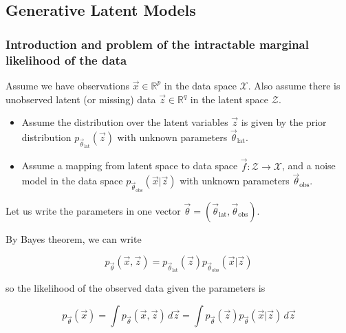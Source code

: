 
\subsection{Generative Latent Models}
\subsubsection{Introduction and problem of the intractable marginal likelihood of the data}
Assume we have observations $\vec{x} \in \mathbb{R}^p$ in the data space $\mathcal{X}$. 
Also assume there is unobserved latent (or missing) 
data $\vec{z} \in \mathbb{R}^q$ in the latent space $\mathcal{Z}$.

\begin{itemize}
    \item Assume the distribution over the latent variables $\vec{z}$ is given
    by the prior distribution $p_{\vec{\theta}_{\text{lat}}}(\vec{z})$ with unknown parameters
    $\vec{\theta}_{\text{lat}}$.
    \item Assume a mapping from latent space to data space $\vec{f}: \mathcal{Z} \rightarrow \mathcal{X}$,
    and a noise model in the data space $p_{\vec{\theta}_{\text{obs}}}(\vec{x} | \vec{z})$ with unknown parameters
    $\vec{\theta}_{\text{obs}}$.
\end{itemize}

Let us write the parameters in one vector $\vec{\theta} = (\vec{\theta}_{\text{lat}}, \vec{\theta}_{\text{obs}})$.



By Bayes theorem, we can write

\begin{equation}
    p_\vec{\theta}(\vec{x},\vec{z}) = p_{\vec{\theta}_{\text{lat}}}(\vec{z}) p_{\vec{\theta}_{\text{obs}}}(\vec{x} | \vec{z})
\end{equation}

so the likelihood of the observed data given the parameters is

\begin{equation}
    p_\vec{\theta}(\vec{x}) = \int p_\vec{\theta}(\vec{x}, \vec{z}) \, d\vec{z} = \int p_{\vec{\theta}}(\vec{z}) p_{\vec{\theta}}(\vec{x} | \vec{z}) \, d\vec{z}
\end{equation}

